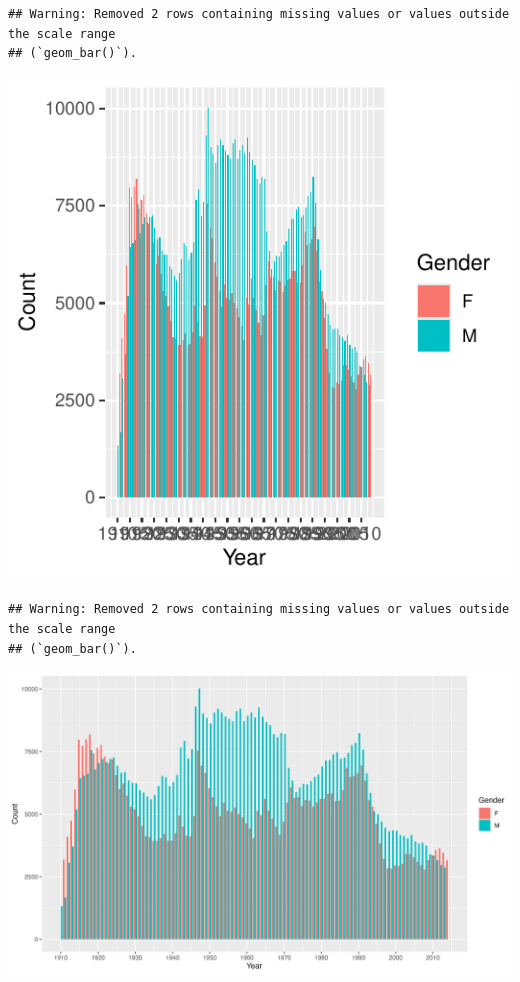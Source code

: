 \documentclass[11pt,preprint]{elsarticle}
\let\origfigure\figure
\let\endorigfigure\endfigure
\renewenvironment{figure}[1][2] {
    \expandafter\origfigure\expandafter[H]
} {
    \endorigfigure
}
\numberwithin{equation}{section}
\numberwithin{figure}{section}
\numberwithin{table}{section}
\begin{document}
\begin{verbatim}
## Warning: Removed 2 rows containing missing values or values outside the scale range
## (`geom_bar()`).
\end{verbatim}

\begin{figure}
\centering
\includegraphics{Task_1_files/figure-latex/unnamed-chunk-4-1.pdf}
\caption{Correlation Trend Over Time}
\end{figure}

\begin{verbatim}
## Warning: Removed 2 rows containing missing values or values outside the scale range
## (`geom_bar()`).
\end{verbatim}

\begin{figure}
\includegraphics[width=41.67in]{results/mainstream_bar_plot} \caption{Correlation Trend Over Time}\label{fig:unnamed-chunk-4-2}
\end{figure}
\end{document}
